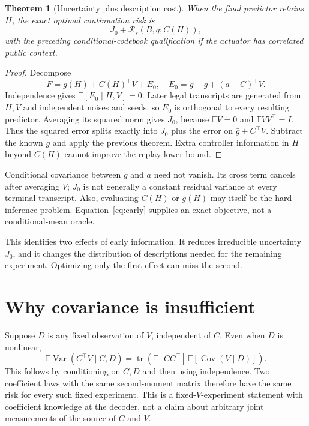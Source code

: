 \documentclass[11pt]{article}
\newcommand{\E}{\mathbb E}
\newcommand{\Var}{\operatorname{Var}}
\newcommand{\Cov}{\operatorname{Cov}}
\newcommand{\tr}{\operatorname{tr}}
\newtheorem{theorem}{Theorem}
\begin{document}
\begin{theorem}[Uncertainty plus description cost]
When the final predictor retains $H$, the exact optimal continuation risk is
\begin{equation}
J_0+\mathcal R_s(B,q;C(H)),
\label{eq:early}
\end{equation}
with the preceding conditional-codebook qualification if the actuator has correlated public context.
\end{theorem}

\begin{proof}
Decompose
\[
F=\bar g(H)+C(H)^\top V+E_0,
\quad E_0=g-\bar g+(a-C)^\top V.
\]
Independence gives $\E[E_0\mid H,V]=0$. Later legal transcripts are generated from $H,V$ and independent noises and seeds, so $E_0$ is orthogonal to every resulting predictor. Averaging its squared norm gives $J_0$, because $\E V=0$ and $\E VV^\top=I$. Thus the squared error splits exactly into $J_0$ plus the error on $\bar g+C^\top V$. Subtract the known $\bar g$ and apply the previous theorem. Extra controller information in $H$ beyond $C(H)$ cannot improve the replay lower bound.
\end{proof}

Conditional covariance between $g$ and $a$ need not vanish. Its cross term cancels after averaging $V$; $J_0$ is not generally a constant residual variance at every terminal transcript. Also, evaluating $C(H)$ or $\bar g(H)$ may itself be the hard inference problem. Equation~\eqref{eq:early} supplies an exact objective, not a conditional-mean oracle.

This identifies two effects of early information. It reduces irreducible uncertainty $J_0$, and it changes the distribution of descriptions needed for the remaining experiment. Optimizing only the first effect can miss the second.

\section{Why covariance is insufficient}

Suppose $D$ is any fixed observation of $V$, independent of $C$. Even when $D$ is nonlinear,
\begin{equation}
\E\Var(C^\top V\mid C,D)
=\tr\!\left(\E[CC^\top]\,\E[\Cov(V\mid D)]\right).
\label{eq:cov}
\end{equation}
This follows by conditioning on $C,D$ and then using independence. Two coefficient laws with the same second-moment matrix therefore have the same risk for every such fixed experiment. This is a fixed-$V$-experiment statement with coefficient knowledge at the decoder, not a claim about arbitrary joint measurements of the source of $C$ and $V$.
\end{document}
